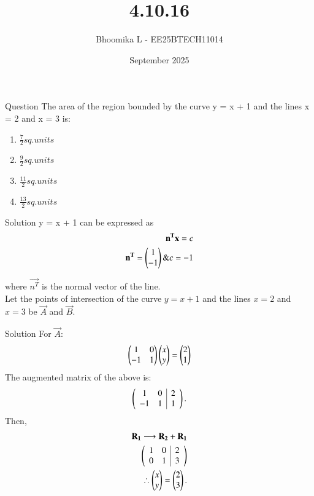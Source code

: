\documentclass{beamer}
\title %
{4.10.16}
\date{September  2025}
\author %
{Bhoomika L - EE25BTECH11014}
\begin{document}
\frame{\titlepage}
\begin{frame}{Question}
The area of the region bounded by the curve y = x + 1 and the lines x = 2
and x = 3 is:
\begin{multicols}
\begin{enumerate}
    \item $\frac{7}{2} sq.units$
    \item $\frac{9}{2} sq.units$
    \item $\frac{11}{2} sq.units$
    \item $\frac{13}{2} sq.units$
\end{enumerate}
\end{multicols}
\end{frame}

\begin{frame}{Solution}
y = x + 1 can be expressed as
\begin{align}
 \mathbf{n^Tx}=c\\
\mathbf{n^T}=\begin{pmatrix}1\\-1\end{pmatrix} \& c=-1
\end{align}

where $\vec{n^T}$ is the normal vector of the line.\\
Let the points of intersection of the curve $y = x + 1$ and the lines $x=2$ and $x=3$ be
$\vec{A}$ and $\vec{B}.$
\end{frame}

\begin{frame}{Solution}
For $\vec{A}$:
\begin{align}
\begin{pmatrix}1 & 0 \\ 
-1 & 1\end{pmatrix}
\begin{pmatrix}x\\y\end{pmatrix}=\begin{pmatrix}2\\1\end{pmatrix}
\end{align}
The augmented matrix of the above is:
\begin{align}
\begin{pmatrix}\begin{array}{cc|c}
1 & 0 & 2 \\ 
-1 & 1 & 1
\end{array}\end{pmatrix}.
\end{align}
Then, 
\begin{align}
    \mathbf{R_1}\longrightarrow\mathbf{R_2}+\mathbf{R_1}\\
  \begin{pmatrix}\begin{array}{cc|c}
1 & 0 & 2 \\ 
0 & 1 & 3
\end{array}\end{pmatrix}\\
\therefore \begin{pmatrix}x\\y\end{pmatrix}=\begin{pmatrix}2\\3\end{pmatrix}.
\end{align}    
\end{frame}
\end{document}
